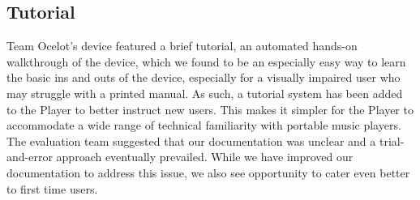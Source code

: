 \documentclass[10pt,letterpaper]{article}
\begin{document}
\subsection*{Tutorial}
Team Ocelot's device featured a brief tutorial, an automated hands-on walkthrough of the device, which we found to be an especially easy way to learn the basic ins and outs of the device, especially for a visually impaired user who may struggle with a printed manual. As such, a tutorial system has been added to the Player to better instruct new users. This makes it simpler for the Player to accommodate a wide range of technical familiarity with portable music players. The evaluation team suggested that our documentation was unclear and a trial-and-error approach eventually prevailed. While we have improved our documentation to address this issue, we also see opportunity to cater even better to first time users.
\end{document}

